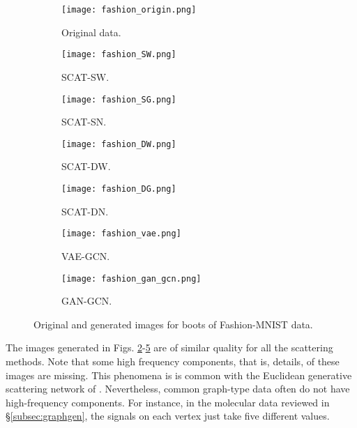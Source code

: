 \documentclass[conference]{IEEEtran}
\begin{document}
\begin{figure*}[t]
  \centering
  \begin{subfigure}[b]{.24\linewidth}
    \centering\texttt{[image: fashion\_origin.png]}
    \caption{Original data. 
    \label{fig:fashionorigin}}
  \end{subfigure}\begin{subfigure}[b]{.24\linewidth}
    \centering\texttt{[image: fashion\_SW.png]}
    \caption{SCAT-SW.  
  \label{fig:fashion-scat-sw}}
  \end{subfigure}
  \begin{subfigure}[b]{.24\linewidth}
    \centering\texttt{[image: fashion\_SG.png]}
    \caption{SCAT-SN. 
    \label{fig:fashion-scat-sg}}
  \end{subfigure}
  \begin{subfigure}[b]{.24\linewidth}
    \centering\texttt{[image: fashion\_DW.png]}
    \caption{SCAT-DW. 
    \label{fig:fashion-scat-dw}}
  \end{subfigure}
  \hfill
  \begin{subfigure}[b]{.24\linewidth}
    \centering\texttt{[image: fashion\_DG.png]}
    \caption{SCAT-DN. 
    \label{fig:fashion-scat-dg}}
  \end{subfigure}\begin{subfigure}[b]{.24\linewidth}
    \centering\texttt{[image: fashion\_vae.png]}
    \caption{VAE-GCN.  
  \label{fig:fashion-vae}}
  \end{subfigure}
  \begin{subfigure}[b]{.24\linewidth}
    \centering\texttt{[image: fashion\_gan\_gcn.png]}
    \caption{GAN-GCN. 
    \label{fig:fashion-gan-gnn}}
  \end{subfigure}  
  \caption{Original and generated images for boots of Fashion-MNIST data.}
  \label{fig:mnist}
\end{figure*}

The images generated in Figs. \ref{fig:fashion-scat-sw}-\ref{fig:fashion-scat-dg} are of similar quality for all the scattering methods. Note that some high frequency components, that is, details, of these images are missing. This phenomena is is common with the Euclidean generative scattering network of \cite{angles2018generative}. Nevertheless, common graph-type data often do not have high-frequency {components}. For instance, in the molecular data reviewed in \S\ref{subsec:graphgen}, the signals on each vertex just take five different values. 
\end{document}
